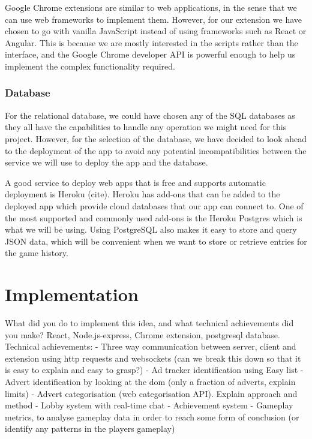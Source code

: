 \documentclass{l4proj}
\begin{document}
Google Chrome extensions are similar to web applications, in the sense that we can use web frameworks to implement them. However, for our extension we have chosen to go with vanilla JavaScript instead of using frameworks such as React or Angular.
This is because we are mostly interested in the scripts rather than the interface, and the Google Chrome developer API is powerful enough to help us implement the complex functionality required.

\subsection{Database}
For the relational database, we could have chosen any of the SQL databases as they all have the capabilities to handle any operation we might need for this project. However, for the selection of the database, we have decided to look ahead to the deployment of the 
app to avoid any potential incompatibilities between the service we will use to deploy the app and the database. 

A good service to deploy web apps that is free and supports automatic deployment is Heroku (cite). Heroku has add-ons that can be added to the deployed app which provide cloud databases that
our app can connect to. One of the most supported and commonly used add-ons is the Heroku Postgres which is what we will be using. Using PostgreSQL also makes it easy to store and query JSON data, which will be convenient when we want to store or retrieve entries for the game history.

\chapter{Implementation}
\label{implementation}
What did you do to implement this idea, and what technical achievements did you make? 
React, Node.js-express, Chrome extension, postgresql database. 
Technical achievements:
- Three way communication between server, client and extension using http requests and websockets (can we break this down so that it is easy to explain and easy to grasp?)
- Ad tracker identification using Easy list
- Advert identification by looking at the dom (only a fraction of adverts, explain limits)
- Advert categorisation (web categorisation API). Explain approach and method
- Lobby system with real-time chat
- Achievement system
- Gameplay metrics, to analyse gameplay data in order to reach some form of conclusion (or identify any patterns in the players gameplay)
\end{document}
